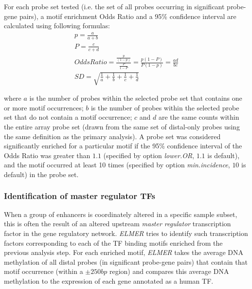 For each probe set tested (i.e. the set of all probes occurring in significant probe-gene pairs),
a motif enrichment Odds Ratio and a 95\% confidence interval are calculated using following formulas:
\begin{subequations}
\begin{align}
p = \frac{a}{a + b} \\
P = \frac{c}{c + d} \\
Odds Ratio = \frac{\frac{p}{(1-p)}}{\frac{P}{1-P}}= \frac{p(1-P)}{P(1-p)}=\frac{ad}{bc} \\
SD = \sqrt{\frac{1}{a} + \frac{1}{b} + \frac{1}{c} + \frac{1}{d}}
\end{align}
\end{subequations}

where $a$ is the number of probes within the selected probe set that contains one
or more motif occurrences; $b$ is the number of probes within the selected probe
set that do not contain a motif occurrence; $c$ and $d$ are the same counts within
the entire array probe set (drawn from the same set of distal-only probes using the same definition as the primary analysis). A probe set was considered significantly enriched
for a particular motif if the 95\% confidence interval of the Odds Ratio was
greater than $1.1$ (specified by option \textit{lower.OR}, $1.1$ is default), and the motif
occurred at least 10 times (specified by option \textit{min.incidence}, $10$ is default) in
the probe set.

\subsubsection{Identification of master regulator TFs}

When a group of enhancers is coordinately altered in a specific sample subset,
this is often the result of an altered upstream \textit{master regulator}
transcription factor in the gene regulatory network. \textit{ELMER} tries to identify such
transcription factors corresponding to each of the TF binding motifs enriched from the previous
analysis step.
For each enriched motif, \textit{ELMER} takes the average DNA methylation of all
distal probes (in significant probe-gene pairs) that contain that motif occurrence
(within a $\pm 250bp$ region) and compares this average DNA methylation to the
expression of each gene annotated as a human TF.

